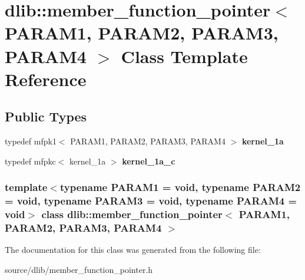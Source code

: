 \hypertarget{classdlib_1_1member__function__pointer}{
\section{dlib::member\_\-function\_\-pointer$<$ PARAM1, PARAM2, PARAM3, PARAM4 $>$ Class Template Reference}
\label{classdlib_1_1member__function__pointer}
}
\subsection*{Public Types}
\begin{DoxyCompactItemize}
\item 
\hypertarget{classdlib_1_1member__function__pointer_ab92e49c1021e565d4f3f9873769a872f}{
typedef mfpk1$<$ PARAM1, PARAM2, PARAM3, PARAM4 $>$ {\bfseries kernel\_\-1a}}
\label{classdlib_1_1member__function__pointer_ab92e49c1021e565d4f3f9873769a872f}

\item 
\hypertarget{classdlib_1_1member__function__pointer_a57ee3394c07b36621e822412a159721a}{
typedef mfpkc$<$ kernel\_\-1a $>$ {\bfseries kernel\_\-1a\_\-c}}
\label{classdlib_1_1member__function__pointer_a57ee3394c07b36621e822412a159721a}

\end{DoxyCompactItemize}
\subsubsection*{template$<$typename PARAM1 = void, typename PARAM2 = void, typename PARAM3 = void, typename PARAM4 = void$>$ class dlib::member\_\-function\_\-pointer$<$ PARAM1, PARAM2, PARAM3, PARAM4 $>$}



The documentation for this class was generated from the following file:\begin{DoxyCompactItemize}
\item 
source/dlib/member\_\-function\_\-pointer.h\end{DoxyCompactItemize}
